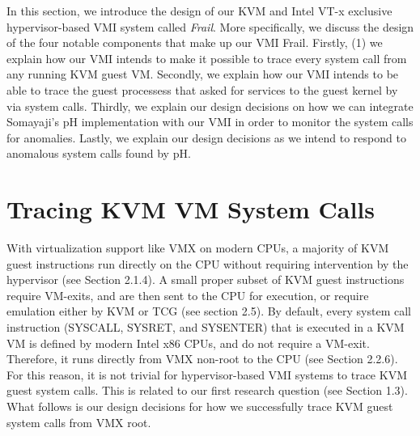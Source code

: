 \documentclass{report}
\begin{document}
\begin{spacing}{1.5}
{\large
In this section, we introduce the design of our KVM and Intel VT-x exclusive hypervisor-based VMI system called \textit{Frail}. More specifically, we discuss the design of the four notable components that make up our VMI Frail. Firstly, (1) we explain how our VMI intends to make it possible to trace every system call from any running KVM guest VM. Secondly, we explain how our VMI intends to be able to trace the guest processess that asked for services to the guest kernel by via system calls. Thirdly, we explain our design decisions on how we can integrate Somayaji's pH implementation with our VMI in order to monitor the system calls for anomalies. Lastly, we explain our design decisions as we intend to respond to anomalous system calls found by pH. 
\newline
}

\section{Tracing KVM VM System Calls}
{\large
With virtualization support like VMX on modern CPUs, a majority of KVM guest instructions run directly on the CPU without requiring intervention by the hypervisor (see Section 2.1.4). A small proper subset of KVM guest instructions require VM-exits, and are then sent to the CPU for execution, or require emulation either by KVM or TCG (see section 2.5). By default, every system call instruction (SYSCALL, SYSRET, and SYSENTER) that is executed in a KVM VM is defined by modern Intel x86 CPUs, and do not require a VM-exit. Therefore, it runs directly from VMX non-root to the CPU (see Section 2.2.6). For this reason, it is not trivial for hypervisor-based VMI systems to trace KVM guest system calls. This is related to our first research question (see Section 1.3). What follows is our design decisions for how we successfully trace KVM guest system calls from VMX root.
\newline
}



\end{spacing}
\end{document}
